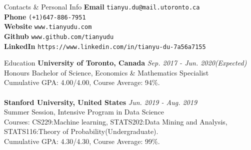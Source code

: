 \documentclass{resume} %
\begin{document}

\begin{rSection}{Contacts \& Personal Info}
	\textbf{Email} \texttt{tianyu.du@mail.utoronto.ca}
	\\
	\textbf{Phone} \texttt{(+1)647-886-7951}
	\\
	\textbf{Website} \texttt{www.tianyudu.com}
	\\
	\textbf{Github} \texttt{www.github.com/tianyudu}
	\\
	\textbf{LinkedIn} \texttt{https://www.linkedin.com/in/tianyu-du-7a56a7155}
\end{rSection}


\begin{rSection}{Education}
{\bf University of Toronto, Canada} \hfill {\em Sep. 2017 - Jun. 2020(Expected)} 
\\ Honours Bachelor of Science, Economics \& Mathematics Specialist
\\ Cumulative GPA: 4.00/4.00, Course Average: 94\%.
\\
\\{\bf Stanford University, United States} \hfill {\em Jun. 2019 - Aug. 2019} 
\\ Summer Session, Intensive Program in Data Science
\\ Courses: CS229:Machine learning, STATS202:Data Mining and Analysis, STATS116:Theory of Probability(Undergraduate).
\\ Cumulative GPA: 4.30/4.30, Course Average: 99\%.
\end{rSection}
\end{document}

